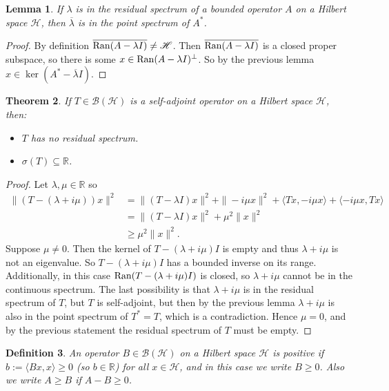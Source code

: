 \documentclass[12pt,oneside]{report}
\newtheorem{thm}{Theorem}[chapter]
\newtheorem{lem}[thm]{Lemma}
\newtheorem{defn}[thm]{Definition}
\begin{document}
\begin{lem}
    If $\lambda$ is in the residual spectrum of a bounded operator $A$ on a Hilbert space $\mathscr{H}$, then $\overline{\lambda}$ is in the point spectrum of $A^{*}$.
\end{lem}
\begin{proof}
    By definition $\overline{\mathrm{Ran}(A - \lambda I)} \neq \mathscr{H}$. Then $\overline{\mathrm{Ran}(A - \lambda I)}$ is a closed proper subspace, so there is some $x \in \mathrm{Ran}(A - \lambda I)^{\perp}$. So by the previous lemma $x \in \ker(A^{*} - \overline{\lambda} I)$.
\end{proof}

\begin{thm}
    If $T \in \mathscr{B}(\mathscr{H})$ is a self-adjoint operator on a Hilbert space $\mathscr{H}$, then:
    \begin{itemize}
        \item[a)] $T$ has no residual spectrum.
        \item[b)] $\sigma(T) \subseteq \mathbb{R}$.
    \end{itemize}
\end{thm}
\begin{proof}
    Let $\lambda, \mu \in \mathbb{R}$ so 
    \begin{align}
        \|(T - (\lambda + i \mu))x\|^{2} &= \|(T - \lambda I)x\|^{2} + \|-i \mu x\|^{2} + \langle Tx, -i \mu x \rangle +            \langle -i \mu x, Tx \rangle \\
        &= \|(T - \lambda I)x\|^{2} +\mu^{2}\|x\|^{2} \\
        &\geq \mu^{2}\|x\|^{2}.
    \end{align}
    Suppose $\mu \neq 0$. Then the kernel of $T - (\lambda + i \mu)I$ is empty and thus $\lambda + i \mu$ is not an eigenvalue. So $T - (\lambda + i \mu)I$ has a bounded inverse on its range. Additionally, in this case $\mathrm{Ran}(T - (\lambda + i \mu)I)$ is closed, so $\lambda + i \mu$ cannot be in the continuous spectrum. The last possibility is that $\lambda + i \mu$ is in the residual spectrum of $T$, but $T$ is self-adjoint, but then by the previous lemma $\lambda + i \mu$ is also in the point spectrum of $T^{*} = T$, which is a contradiction. Hence $\mu = 0$, and by the previous statement the residual spectrum of $T$ must be empty.
\end{proof}

\begin{defn}
    An operator $B \in \mathscr{B}(\mathscr{H})$ on a Hilbert space $\mathscr{H}$ is positive if $b := \langle Bx, x \rangle \geq 0$ (so $b \in \mathbb{R}$) for all $x \in \mathscr{H}$, and in this case we write $B \geq 0$. Also we write $A \geq B$ if $A - B \geq 0$.
\end{defn}
\end{document}
